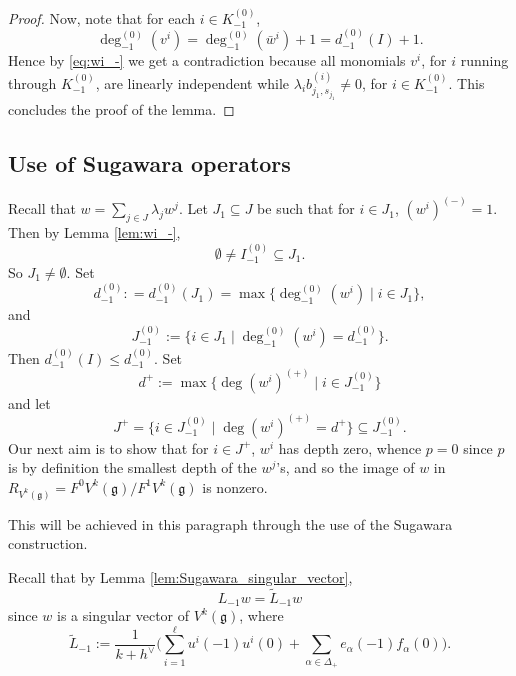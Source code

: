 \documentclass[JEP,XML,SOM,Unicode]{cedram}
\let\oldvee\vee
\renewcommand{\vee}{{\scriptscriptstyle\oldvee}}
\let\al\alpha
\newcommand \g{\mathfrak g}
\theoremstyle{definition}
\begin{document}
\begin{proof}
Now, note that for each $i \in K_{-1}^{(0)}$,
\[
\deg_{-1}^{(0)}(v^{i})=\deg_{-1}^{(0)}(\bar w^{i})+1 = d_{-1}^{(0)}(I) +1.
\]
Hence by \eqref{eq:wi_-} we get a contradiction because all monomials
$v^{i}$, for $i$ running through $K_{-1}^{(0)}$, are linearly independent
while $\lambda_i b_{j_1,s_{j_1}}^{(i)} \not=0$, for $i\in K_{-1}^{(0)}$.
This concludes the proof of the lemma.
\end{proof}

\subsection{Use of Sugawara operators}
\label{sub:Sugawara operators}
Recall that $w = \sum_{j \in J} \lambda_j w^j$.
Let $J_1\subseteq J$ be such that for $i\in J_1$, $(w^i)^{(-)}=1$. Then by Lemma \ref{lem:wi_-},
\[
\emptyset \neq I_{-1}^{(0)}\subseteq J_1.
\]
So $J_1\neq \emptyset.$
Set
\[
{d}_{-1}^{(0)}: = {d}_{-1}^{(0)} (J_1) = \max\{\deg_{-1}^{(0)}(w^i) \mid i \in J_1\},
\]
and
\[
J_{-1}^{(0)} := \{ i\in J_1 \mid \deg_{-1}^{(0)}(w^i)= {d}_{-1}^{(0)}\}.
\]
Then $d_{-1}^{(0)}(I)\leq {d}_{-1}^{(0)}$. Set
\[
d^{+} := \max\{\deg (w^{i})^{(+)} \mid i \in J_{-1}^{(0)} \}
\]
and let
\[
J^+= \{i \in J_{-1}^{(0)} \mid \deg (w^{i})^{(+)}= d^{+} \}\subseteq J_{-1}^{(0)}.
\]
Our next aim is to show that for $i\in J^+$,
$w^{i}$ has depth zero, whence $p=0$ since $p$ is by definition
the smallest depth of the $w^j$'s, and so
the image of $w$ in
$R_{V^k(\g)} = F^0 V^k(\g)/ F^1 V^k(\g)$ is nonzero.

This will be achieved in this paragraph through the use of
the Sugawara construction.

Recall that
by Lemma \ref{lem:Sugawara_singular_vector},
\[
L_{-1} w=\tilde{L}_{-1} w
\]
since $w$ is a singular vector of $V^k(\g)$, where
\begin{equation*}
{\tilde{L}_{-1}:=\dfrac{1}{k+h^\vee} \biggl(\sum_{i=1}^{\ell}u^i(-1)u^i(0)
+\sum_{\al\in{\Delta}_{+}}e_{\al}(-1)f_{\al}(0)\biggr)}.
\end{equation*}
\end{document}
